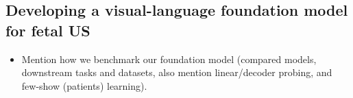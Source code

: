 
    

\subsection{Developing a visual-language foundation model for fetal US}

\begin{itemize}
    \item Mention how we benchmark our foundation model (compared models, downstream tasks and datasets, also mention linear/decoder probing, and few-show (patients) learning).
\end{itemize}



